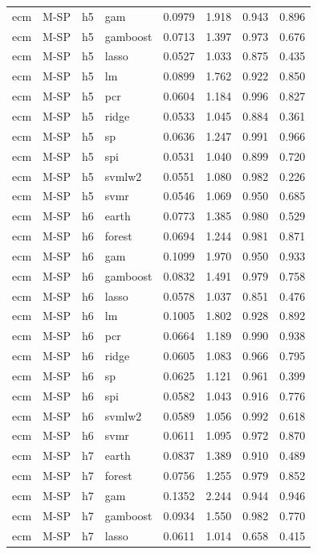 \begin{ThreePartTable}
\begin{longtable}[t]{llclcccc}
ecm & M-SP & h5 & gam & 0.0979 & 1.918 & 0.943 & 0.896\\
ecm & M-SP & h5 & gamboost & 0.0713 & 1.397 & 0.973 & 0.676\\
ecm & M-SP & h5 & lasso & 0.0527 & 1.033 & 0.875 & 0.435\\
ecm & M-SP & h5 & lm & 0.0899 & 1.762 & 0.922 & 0.850\\
ecm & M-SP & h5 & pcr & 0.0604 & 1.184 & 0.996 & 0.827\\
ecm & M-SP & h5 & ridge & 0.0533 & 1.045 & 0.884 & 0.361\\
ecm & M-SP & h5 & sp & 0.0636 & 1.247 & 0.991 & 0.966\\
ecm & M-SP & h5 & spi & 0.0531 & 1.040 & 0.899 & 0.720\\
ecm & M-SP & h5 & svmlw2 & 0.0551 & 1.080 & 0.982 & 0.226\\
ecm & M-SP & h5 & svmr & 0.0546 & 1.069 & 0.950 & 0.685\\
\addlinespace
ecm & M-SP & h6 & earth & 0.0773 & 1.385 & 0.980 & 0.529\\
ecm & M-SP & h6 & forest & 0.0694 & 1.244 & 0.981 & 0.871\\
ecm & M-SP & h6 & gam & 0.1099 & 1.970 & 0.950 & 0.933\\
ecm & M-SP & h6 & gamboost & 0.0832 & 1.491 & 0.979 & 0.758\\
ecm & M-SP & h6 & lasso & 0.0578 & 1.037 & 0.851 & 0.476\\
ecm & M-SP & h6 & lm & 0.1005 & 1.802 & 0.928 & 0.892\\
ecm & M-SP & h6 & pcr & 0.0664 & 1.189 & 0.990 & 0.938\\
ecm & M-SP & h6 & ridge & 0.0605 & 1.083 & 0.966 & 0.795\\
ecm & M-SP & h6 & sp & 0.0625 & 1.121 & 0.961 & 0.399\\
ecm & M-SP & h6 & spi & 0.0582 & 1.043 & 0.916 & 0.776\\
ecm & M-SP & h6 & svmlw2 & 0.0589 & 1.056 & 0.992 & 0.618\\
ecm & M-SP & h6 & svmr & 0.0611 & 1.095 & 0.972 & 0.870\\
\addlinespace
ecm & M-SP & h7 & earth & 0.0837 & 1.389 & 0.910 & 0.489\\
ecm & M-SP & h7 & forest & 0.0756 & 1.255 & 0.979 & 0.852\\
ecm & M-SP & h7 & gam & 0.1352 & 2.244 & 0.944 & 0.946\\
ecm & M-SP & h7 & gamboost & 0.0934 & 1.550 & 0.982 & 0.770\\
ecm & M-SP & h7 & lasso & 0.0611 & 1.014 & 0.658 & 0.415\\

\end{longtable}
\end{ThreePartTable}
